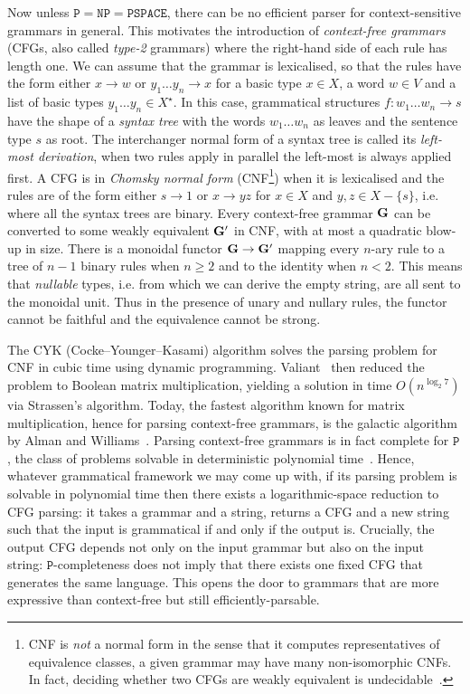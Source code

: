 Now unless $\mathtt{P} = \mathtt{NP} = \mathtt{PSPACE}$, there can be no efficient parser for context-sensitive grammars in general.
This motivates the introduction of \emph{context-free grammars} (CFGs, also called \emph{type-2} grammars) where the right-hand side of each rule has length one.
We can assume that the grammar is lexicalised, so that the rules have the form either $x \to w$ or $y_1 \dots y_n \to x$ for a basic type $x \in X$, a word $w \in V$ and a list of basic types $y_1 \dots y_n \in X^\star$.
In this case, grammatical structures $f : w_1 \dots w_n \to s$ have the shape of a \emph{syntax tree} with the words $w_1 \dots w_n$ as leaves and the sentence type $s$ as root.
The interchanger normal form of a syntax tree is called its \emph{left-most derivation}, when two rules apply in parallel the left-most is always applied first.
A CFG is in \emph{Chomsky normal form} (CNF\footnote
{CNF is \emph{not} a normal form in the sense that it computes representatives of equivalence classes, a given grammar may have many non-isomorphic CNFs.
In fact, deciding whether two CFGs are weakly equivalent is undecidable~\cite[Theorem~26]{Chomsky63}.}) when it is lexicalised and the rules are of the form either $s \to 1$ or $x \to y z$ for $x \in X$ and $y, z \in X - \{ s \}$, i.e. where all the syntax trees are binary.
Every context-free grammar $\mathbf{G}$ can be converted to some weakly equivalent $\mathbf{G}'$ in CNF, with at most a quadratic blow-up in size.
There is a monoidal functor $\mathbf{G} \to \mathbf{G}'$ mapping every $n$-ary rule to a tree of $n - 1$ binary rules when $n \geq 2$ and to the identity when $n < 2$.
This means that \emph{nullable} types, i.e. from which we can derive the empty string, are all sent to the monoidal unit.
Thus in the presence of unary and nullary rules, the functor cannot be faithful and the equivalence cannot be strong.

The CYK (Cocke–Younger–Kasami) algorithm solves the parsing problem for CNF in cubic time using dynamic programming.
Valiant~\cite{Valiant75} then reduced the problem to Boolean matrix multiplication, yielding a solution in time $O(n^{\log_2 7})$ via Strassen's algorithm.
Today, the fastest algorithm known for matrix multiplication, hence for parsing context-free grammars, is the galactic algorithm by Alman and Williams~\cite{AlmanWilliams20}.
Parsing context-free grammars is in fact complete for $\mathtt{P}$, the class of problems solvable in deterministic polynomial time~\cite{JonesLaaser74}.
Hence, whatever grammatical framework we may come up with, if its parsing problem is solvable in polynomial time then there exists a logarithmic-space reduction to CFG parsing: it takes a grammar and a string, returns a CFG and a new string such that the input is grammatical if and only if the output is.
Crucially, the output CFG depends not only on the input grammar but also on the input string: $\mathtt{P}$-completeness does not imply that there exists one fixed CFG that generates the same language.
This opens the door to grammars that are more expressive than context-free but still efficiently-parsable.

